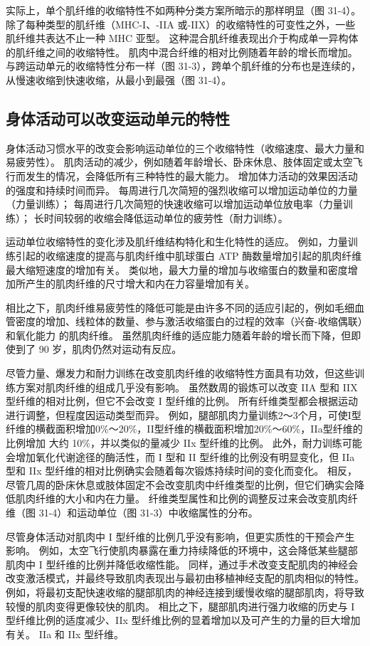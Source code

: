 实际上，单个肌纤维的收缩特性不如两种分类方案所暗示的那样明显（图 31-4）。 除了每种类型的肌纤维（MHC-I、-IIA 或-IIX）的收缩特性的可变性之外，一些肌纤维共表达不止一种 MHC 亚型。 这种混合肌纤维表现出介于构成单一异构体的肌纤维之间的收缩特性。 肌肉中混合纤维的相对比例随着年龄的增长而增加。 与跨运动单元的收缩特性分布一样（图 31-3），跨单个肌纤维的分布也是连续的，从慢速收缩到快速收缩，从最小到最强（图 31-4）。

\subsection{身体活动可以改变运动单元的特性}
身体活动习惯水平的改变会影响运动单位的三个收缩特性（收缩速度、最大力量和易疲劳性）。 肌肉活动的减少，例如随着年龄增长、卧床休息、肢体固定或太空飞行而发生的情况，会降低所有三种特性的最大能力。 增加体力活动的效果因活动的强度和持续时间而异。 每周进行几次简短的强烈收缩可以增加运动单位的力量（力量训练）； 每周进行几次简短的快速收缩可以增加运动单位放电率（力量训练）； 长时间较弱的收缩会降低运动单位的疲劳性（耐力训练）。

运动单位收缩特性的变化涉及肌纤维结构特化和生化特性的适应。 例如，力量训练引起的收缩速度的提高与肌肉纤维中肌球蛋白 ATP 酶数量增加引起的肌肉纤维最大缩短速度的增加有关。 类似地，最大力量的增加与收缩蛋白的数量和密度增加所产生的肌肉纤维的尺寸增大和内在力容量增加有关。

相比之下，肌肉纤维易疲劳性的降低可能是由许多不同的适应引起的，例如毛细血管密度的增加、线粒体的数量、参与激活收缩蛋白的过程的效率（兴奋-收缩偶联）和氧化能力 的肌肉纤维。 虽然肌肉纤维的适应能力随着年龄的增长而下降，但即使到了 90 岁，肌肉仍然对运动有反应。

尽管力量、爆发力和耐力训练在改变肌肉纤维的收缩特性方面具有功效，但这些训练方案对肌肉纤维的组成几乎没有影响。 虽然数周的锻炼可以改变 IIA 型和 IIX 型纤维的相对比例，但它不会改变 I 型纤维的比例。 所有纤维类型都会根据运动进行调整，但程度因运动类型而异。 例如，腿部肌肉力量训练2～3个月，可使I型纤维的横截面积增加0\%～20\%，II型纤维的横截面积增加20\%～60\%，IIa型纤维的比例增加 大约 10\%，并以类似的量减少 IIx 型纤维的比例。 此外，耐力训练可能会增加氧化代谢途径的酶活性，而 I 型和 II 型纤维的比例没有明显变化，但 IIa 型和 IIx 型纤维的相对比例确实会随着每次锻炼持续时间的变化而变化。 相反，尽管几周的卧床休息或肢体固定不会改变肌肉中纤维类型的比例，但它们确实会降低肌肉纤维的大小和内在力量。 纤维类型属性和比例的调整反过来会改变肌肉纤维（图 31-4）和运动单位（图 31-3）中收缩属性的分布。

尽管身体活动对肌肉中 I 型纤维的比例几乎没有影响，但更实质性的干预会产生影响。 例如，太空飞行使肌肉暴露在重力持续降低的环境中，这会降低某些腿部肌肉中 I 型纤维的比例并降低收缩性能。 同样，通过手术改变支配肌肉的神经会改变激活模式，并最终导致肌肉表现出与最初由移植神经支配的肌肉相似的特性。 例如，将最初支配快速收缩的腿部肌肉的神经连接到缓慢收缩的腿部肌肉，将导致较慢的肌肉变得更像较快的肌肉。 相比之下，腿部肌肉进行强力收缩的历史与 I 型纤维比例的适度减少、IIx 型纤维比例的显着增加以及可产生的力量的巨大增加有关。 IIa 和 IIx 型纤维。


